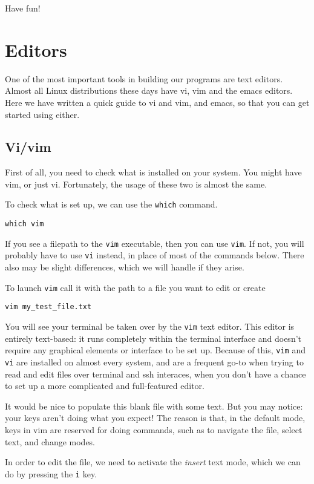 \documentclass[aps,showpacs,prd,notitlepage,preprintnumbers,amsmath,amssymb,letterpaper]{revtex4}
\begin{document}
Have fun!

\section{Editors}

One of the most important tools in building our programs are text
editors.  Almost all Linux distributions these days have vi, vim and
the emacs editors.  Here we have written a quick guide to vi and vim, and emacs, so that you can get started using either.

\subsection{Vi/vim}
First of all, you need to check what is installed on your system. You might have vim, or just vi. Fortunately, the usage of these two is almost the same.

To check what is set up, we can use the \verb|which| command.

\begin{verbatim}
which vim
\end{verbatim}

If you see a filepath to the \verb|vim| executable, then you can use \verb|vim|. If not, you will probably have to use \verb|vi| instead, in place of most of the commands below. There also may be slight differences, which we will handle if they arise.

To launch \verb|vim| call it with the path to a file you want to edit or create
\begin{verbatim}
vim my_test_file.txt
\end{verbatim}

You will see your terminal be taken over by the \verb|vim| text editor.
This editor is entirely text-based: it runs completely within the terminal interface and doesn't require any graphical elements or interface to be set up.
Because of this, \verb|vim| and \verb|vi| are installed on almost every system, and are a frequent go-to when trying to read and edit files over terminal and ssh interaces, when you don't have a chance to set up a more complicated and full-featured editor.

It would be nice to populate this blank file with some text.
But you may notice: your keys aren't doing what you expect!
The reason is that, in the default mode, keys in vim are reserved for doing commands, such as to navigate the file, select text, and change modes.

In order to edit the file, we need to activate the \textit{insert} text mode, which we can do by pressing the \verb|i| key.
\end{document}
